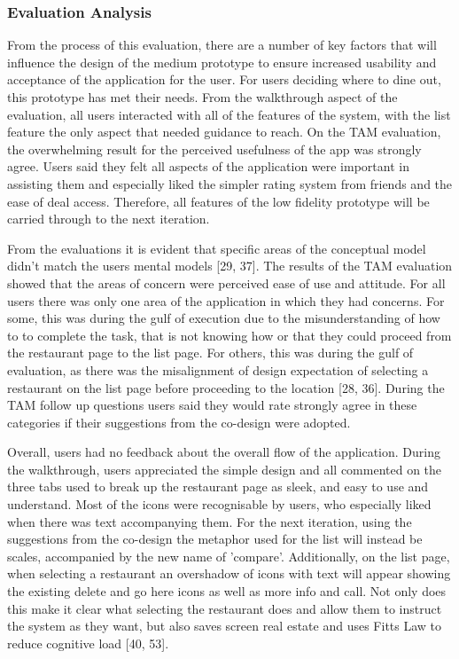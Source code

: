 \documentclass[a4 paper, 12pt]{article}
\begin{document}
\subsubsection{Evaluation Analysis}
From the process of this evaluation, there are a number of key factors that will influence the design of the medium prototype to ensure increased usability and acceptance of the application for the user. For users deciding where to dine out, this prototype has met their needs. From the walkthrough aspect of the evaluation, all users interacted with all of the features of the system, with the list feature the only aspect that needed guidance to reach. On the TAM evaluation, the overwhelming result for the perceived usefulness of the app was strongly agree. Users said they felt all aspects of the application were important in assisting them and especially liked the simpler rating system from friends and the ease of deal access. Therefore, all features of the low fidelity prototype will be carried through to the next iteration.

From the evaluations it is evident that specific areas of the conceptual model didn't match the users mental models [29, 37]. The results of the TAM evaluation showed that the areas of concern were perceived ease of use and attitude. For all users there was only one area of the application in which they had concerns. For some, this was during the gulf of execution due to the misunderstanding of how to to complete the task, that is not knowing how or that they could proceed from the restaurant page to the list page. For others, this was during the gulf of evaluation, as there was the misalignment of design expectation of selecting a restaurant on the list page before proceeding to the location [28, 36]. During the TAM follow up questions users said they would rate strongly agree in these categories if their suggestions from the co-design were adopted. 

Overall, users had no feedback about the overall flow of the application. During the walkthrough, users appreciated the simple design and all commented on the three tabs used to break up the restaurant page as sleek, and easy to use and understand. Most of the icons were recognisable by users, who especially liked when there was text accompanying them. For the next iteration, using the suggestions from the co-design the metaphor used for the list will instead be scales, accompanied by the new name of 'compare'. Additionally, on the list page, when selecting a restaurant an overshadow of icons with text will appear showing the existing delete and go here icons as well as more info and call. Not only does this make it clear what selecting the restaurant does and allow them to instruct the system as they want, but also saves screen real estate and uses Fitts Law to reduce cognitive load [40, 53].  
\end{document}
